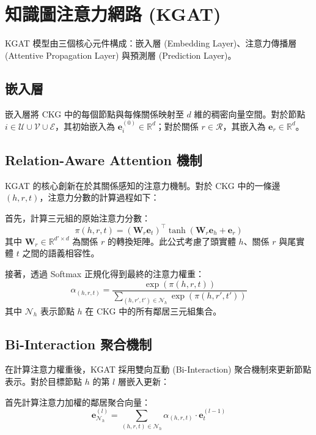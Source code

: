 \section{知識圖注意力網路 (KGAT)}

KGAT 模型由三個核心元件構成：嵌入層 (Embedding Layer)、注意力傳播層 (Attentive Propagation Layer) 與預測層 (Prediction Layer)。

\subsection*{嵌入層}

嵌入層將 CKG 中的每個節點與每條關係映射至 $d$ 維的稠密向量空間。對於節點 $i \in \mathcal{U} \cup \mathcal{V} \cup \mathcal{E}$，其初始嵌入為 $\bm{e}_i^{(0)} \in \mathbb{R}^d$；對於關係 $r \in \mathcal{R}$，其嵌入為 $\bm{e}_r \in \mathbb{R}^d$。

\subsection{Relation-Aware Attention 機制}

KGAT 的核心創新在於其關係感知的注意力機制。對於 CKG 中的一條邊 $(h, r, t)$，注意力分數的計算過程如下：

首先，計算三元組的原始注意力分數：
\begin{equation}
  \pi(h, r, t) = (\bm{W}_r \bm{e}_t)^\top \tanh \left( \bm{W}_r \bm{e}_h + \bm{e}_r \right)
  \label{eq:attention_raw}
\end{equation}
其中 $\bm{W}_r \in \mathbb{R}^{d' \times d}$ 為關係 $r$ 的轉換矩陣。此公式考慮了頭實體 $h$、關係 $r$ 與尾實體 $t$ 之間的語義相容性。

接著，透過 Softmax 正規化得到最終的注意力權重：
\begin{equation}
  \alpha_{(h,r,t)} = \frac{\exp\left(\pi(h,r,t)\right)}{\sum_{(h,r',t') \in \mathcal{N}_h} \exp\left(\pi(h,r',t')\right)}
  \label{eq:attention_softmax}
\end{equation}
其中 $\mathcal{N}_h$ 表示節點 $h$ 在 CKG 中的所有鄰居三元組集合。

\subsection{Bi-Interaction 聚合機制}

在計算注意力權重後，KGAT 採用雙向互動 (Bi-Interaction) 聚合機制來更新節點表示。對於目標節點 $h$ 的第 $l$ 層嵌入更新：

首先計算注意力加權的鄰居聚合向量：
\begin{equation}
  \bm{e}_{\mathcal{N}_h}^{(l)} = \sum_{(h,r,t) \in \mathcal{N}_h} \alpha_{(h,r,t)} \cdot \bm{e}_t^{(l-1)}
  \label{eq:neighbor_agg}
\end{equation}

